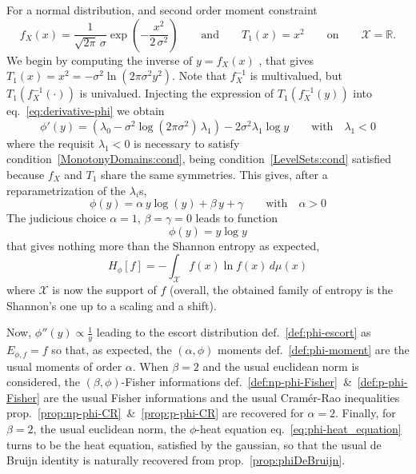 \documentclass[entropy,article,submit,moreauthors,pdftex]{Definitions/mdpi}
\newcommand{\SZ}[1]{{\color{blue} #1}}                                       %
\def\Rset{\mathbb{R}}%
\def\X{\mathcal{X}}%
\begin{document}
For a normal distribution, and second order moment constraint 
%
\[
f_X(x) =  \frac{1}{\sqrt{2\pi} \,\sigma}  \exp\left( -\frac{x^2}{2  \, \sigma^2}
\right)  \qquad \mbox{and}  \qquad T_1(x)  = x^2  \qquad \mbox{on}  \qquad \X  =
\Rset.
\]
%
We begin by computing the inverse of  $y = f_X(x)$\SZ{, that gives $T_1(x) = x^2
  = -  \sigma^2 \ln \left(2 \pi  \sigma^2 y^2 \right)$. Note  that $f_X^{-1}$ is
  multivalued,  but   $T_1\left(  f_X^{-1}(  \cdot  )   \right)$  is  univalued.
  Injecting   the   expression   of   $T_1\left(   f_X^{-1}(y)   \right)$   into
  eq.~\eqref{eq:derivative-phi} we obtain}
%
\[
\phi'(y) = \left( \lambda_0 - \sigma^2 \log(2 \pi \sigma^2) \, \lambda_1 \right)
- 2 \sigma^2 \lambda_1 \log y \qquad \mbox{with} \quad \lambda_1 < 0
\]
%
\SZ{where   the    requisit   $\lambda_1    <0$   is   necessary    to   satisfy
  condition~\ref{MonotonyDomains:cond},   being   condition~\ref{LevelSets:cond}
  satisfied because $f_X$ and $T_1$ share the same symmetries. This gives, after
  a reparametrization of the $\lambda_i$s,
  \[
  \phi(y)  = \alpha \,  y \log(y)  + \beta \,  y +  \gamma \qquad
  \mbox{with} \quad \alpha > 0
  \]
%
The judicious choice $\alpha = 1, \, \beta = \gamma = 0$
%
}
%
leads to function
%
\[
\phi(y) = y \log y
\]
%
that gives nothing  more than the Shannon entropy as expected,
%
\SZ{
  \[
  H_\phi[f] = - \int_\X f(x) \ln f(x) \, d\mu(x) 
  \]
  where $\X$ is now the support of  $f$ (overall, the obtained family of entropy
  is the Shannon's one up to a scaling and a shift).}

Now,   $\phi''(y)  \propto   \frac1y$   leading  to   the  escort   distribution
\SZ{def.~\ref{def:phi-escort} as}  $E_{\phi,f} =  f$ so  that, as  expected, the
$(\alpha,\phi)$ moments \SZ{def.~\ref{def:phi-moment}} are  the usual moments of
order $\alpha$.   When $\beta = 2$  and the usual euclidean  norm is considered,
the                      $(\beta,\phi)$-Fisher                      informations
\SZ{def.~\ref{def:np-phi-Fisher}~\&~\ref{def:p-phi-Fisher}} are the usual Fisher
informations       and      the       usual      Cram\'er-Rao       inequalities
\SZ{prop.~\ref{prop:np-phi-CR}~\&~\ref{prop:p-phi-CR}} are recovered for $\alpha
=  2$.  Finally,  for $\beta  = 2$,  the usual  euclidean norm,  the $\phi$-heat
equation \SZ{eq.~\eqref{eq:phi-heat_equation}}  turns to  be the  heat equation,
satisfied by  the gaussian, so  that the usual  de Bruijn identity  is naturally
recovered \SZ{from prop.~\ref{prop:phiDeBruijn}}.
\end{document}
